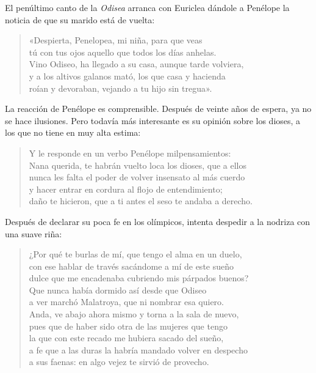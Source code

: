 
El penúltimo canto de la \emph{Odisea} arranca con Euriclea dándole a Penélope la noticia de que su marido está de vuelta:

\begin{verse}
«Despierta, Penelopea, mi niña, para que veas\\
tú con tus ojos aquello que todos los días anhelas.\\
Vino Odiseo, ha llegado a su casa, aunque tarde volviera,\\
y a los altivos galanos mató, los que casa y hacienda\\
roían y devoraban, vejando a tu hijo sin tregua».
\end{verse}

La reacción de Penélope es comprensible. Después de veinte años de espera, ya no se hace ilusiones. Pero todavía más interesante es su opinión sobre los dioses, a los que no tiene en muy alta estima:

\begin{verse}
Y le responde en un verbo Penélope milpensamientos:\\
Nana querida, te habrán vuelto loca los dioses, que a ellos\\
nunca les falta el poder de volver insensato al más cuerdo\\
y hacer entrar en cordura al flojo de entendimiento;\\
daño te hicieron, que a ti antes el seso te andaba a derecho.
\end{verse}

Después de declarar su poca fe en los olímpicos, intenta despedir a la nodriza con una suave riña:

\begin{verse}
¿Por qué te burlas de mí, que tengo el alma en un duelo,\\
con ese hablar de través sacándome a mí de este sueño\\
dulce que me encadenaba cubriendo mis párpados buenos?\\
Que nunca había dormido así desde que Odiseo\\
a ver marchó Malatroya, que ni nombrar esa quiero.\\
Anda, ve abajo ahora mismo y torna a la sala de nuevo,\\
pues que de haber sido otra de las mujeres que tengo\\
la que con este recado me hubiera sacado del sueño,\\
a fe que a las duras la habría mandado volver en despecho\\
a sus faenas: en algo vejez te sirvió de provecho.
\end{verse}

